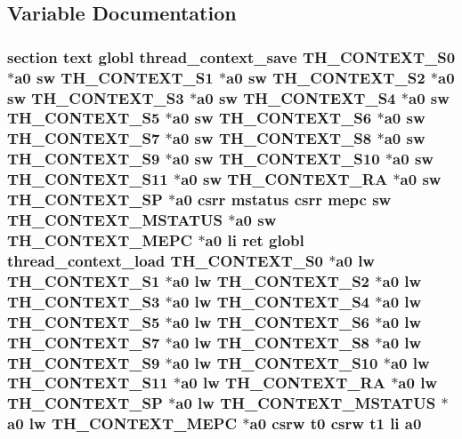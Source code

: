 \subsection{Variable Documentation}
\hypertarget{riscv_2atomic_8S_a3d9d4d3857e499e04ab8a29c34ab004d}{
\subsubsection[{a0}]{\setlength{\rightskip}{0pt plus 5cm}section text globl {\bf thread\-\_\-context\-\_\-save} {\bf T\-H\-\_\-\-C\-O\-N\-T\-E\-X\-T\-\_\-\-S0} $\ast$a0 {\bf sw} {\bf T\-H\-\_\-\-C\-O\-N\-T\-E\-X\-T\-\_\-\-S1} $\ast$a0 {\bf sw} {\bf T\-H\-\_\-\-C\-O\-N\-T\-E\-X\-T\-\_\-\-S2} $\ast$a0 {\bf sw} {\bf T\-H\-\_\-\-C\-O\-N\-T\-E\-X\-T\-\_\-\-S3} $\ast$a0 {\bf sw} {\bf T\-H\-\_\-\-C\-O\-N\-T\-E\-X\-T\-\_\-\-S4} $\ast$a0 {\bf sw} {\bf T\-H\-\_\-\-C\-O\-N\-T\-E\-X\-T\-\_\-\-S5} $\ast$a0 {\bf sw} {\bf T\-H\-\_\-\-C\-O\-N\-T\-E\-X\-T\-\_\-\-S6} $\ast$a0 {\bf sw} {\bf T\-H\-\_\-\-C\-O\-N\-T\-E\-X\-T\-\_\-\-S7} $\ast$a0 {\bf sw} {\bf T\-H\-\_\-\-C\-O\-N\-T\-E\-X\-T\-\_\-\-S8} $\ast$a0 {\bf sw} {\bf T\-H\-\_\-\-C\-O\-N\-T\-E\-X\-T\-\_\-\-S9} $\ast$a0 {\bf sw} {\bf T\-H\-\_\-\-C\-O\-N\-T\-E\-X\-T\-\_\-\-S10} $\ast$a0 {\bf sw} {\bf T\-H\-\_\-\-C\-O\-N\-T\-E\-X\-T\-\_\-\-S11} $\ast$a0 {\bf sw} {\bf T\-H\-\_\-\-C\-O\-N\-T\-E\-X\-T\-\_\-\-R\-A} $\ast$a0 {\bf sw} {\bf T\-H\-\_\-\-C\-O\-N\-T\-E\-X\-T\-\_\-\-S\-P} $\ast$a0 csrr {\bf mstatus} csrr {\bf mepc} {\bf sw} {\bf T\-H\-\_\-\-C\-O\-N\-T\-E\-X\-T\-\_\-\-M\-S\-T\-A\-T\-U\-S} $\ast$a0 {\bf sw} {\bf T\-H\-\_\-\-C\-O\-N\-T\-E\-X\-T\-\_\-\-M\-E\-P\-C} $\ast$a0 {\bf li} ret globl {\bf thread\-\_\-context\-\_\-load} {\bf T\-H\-\_\-\-C\-O\-N\-T\-E\-X\-T\-\_\-\-S0} $\ast$a0 {\bf lw} {\bf T\-H\-\_\-\-C\-O\-N\-T\-E\-X\-T\-\_\-\-S1} $\ast$a0 {\bf lw} {\bf T\-H\-\_\-\-C\-O\-N\-T\-E\-X\-T\-\_\-\-S2} $\ast$a0 {\bf lw} {\bf T\-H\-\_\-\-C\-O\-N\-T\-E\-X\-T\-\_\-\-S3} $\ast$a0 {\bf lw} {\bf T\-H\-\_\-\-C\-O\-N\-T\-E\-X\-T\-\_\-\-S4} $\ast$a0 {\bf lw} {\bf T\-H\-\_\-\-C\-O\-N\-T\-E\-X\-T\-\_\-\-S5} $\ast$a0 {\bf lw} {\bf T\-H\-\_\-\-C\-O\-N\-T\-E\-X\-T\-\_\-\-S6} $\ast$a0 {\bf lw} {\bf T\-H\-\_\-\-C\-O\-N\-T\-E\-X\-T\-\_\-\-S7} $\ast$a0 {\bf lw} {\bf T\-H\-\_\-\-C\-O\-N\-T\-E\-X\-T\-\_\-\-S8} $\ast$a0 {\bf lw} {\bf T\-H\-\_\-\-C\-O\-N\-T\-E\-X\-T\-\_\-\-S9} $\ast$a0 {\bf lw} {\bf T\-H\-\_\-\-C\-O\-N\-T\-E\-X\-T\-\_\-\-S10} $\ast$a0 {\bf lw} {\bf T\-H\-\_\-\-C\-O\-N\-T\-E\-X\-T\-\_\-\-S11} $\ast$a0 {\bf lw} {\bf T\-H\-\_\-\-C\-O\-N\-T\-E\-X\-T\-\_\-\-R\-A} $\ast$a0 {\bf lw} {\bf T\-H\-\_\-\-C\-O\-N\-T\-E\-X\-T\-\_\-\-S\-P} $\ast$a0 {\bf lw} {\bf T\-H\-\_\-\-C\-O\-N\-T\-E\-X\-T\-\_\-\-M\-S\-T\-A\-T\-U\-S} $\ast$a0 {\bf lw} {\bf T\-H\-\_\-\-C\-O\-N\-T\-E\-X\-T\-\_\-\-M\-E\-P\-C} $\ast$a0 csrw {\bf t0} csrw {\bf t1} {\bf li} a0}}\label{riscv_2atomic_8S_a3d9d4d3857e499e04ab8a29c34ab004d}


